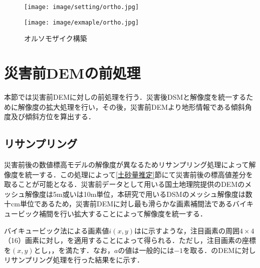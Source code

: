       \begin{figure}[t]
        \begin{minipage}[c]{0.45\hsize}
          \centering
          \texttt{[image: image/setting/ortho.jpg]}
          \label{オルソモザイク構築設定値}
        \end{minipage}
        \begin{minipage}[c]{0.45\hsize}
          \centering
          \texttt{[image: image/exmaple/ortho.jpg]}
          \label{オルソモザイク構築結果}
        \end{minipage}
        \caption{オルソモザイク構築}
      \end{figure}



  \section{災害前DEMの前処理}
    \label{災害前DEMの前処理}
    本節では災害前DEMに対しの前処理を行う．災害後DSMと解像度を統一するために解像度の拡大処理を行い，その後，災害前DEMより地形情報である傾斜角度及び傾斜方位を算出する．


    \subsection{リサンプリング}
      \label{リサンプリング}
      災害前後の数値標高モデルの解像度が異なるためリサンプリング処理によって解像度を統一する．この処理によって\ref{土砂量推定}節にて災害前後の標高値差分を取ることが可能となる．災害前データとして用いる国土地理院提供のDEMのメッシュ解像度は5m或いは10m単位，本研究で用いるDSMのメッシュ解像度は数十cm単位であるため，災害前DEMに対し最も滑らかな画素補間法であるバイキュービック補間\cite{バイキュービック法}を行い拡大することによって解像度を統一する．
      
      バイキュービック法による画素値$i(x,y)$はに示すような，注目画素の周囲$4\times4$（16）画素に対し，を適用することによって得られる．ただし，注目画素の座標を$(x,y)$とし，，を満たす．なお，$a$の値は一般的には$-1$を取る．のDEMに対しリサンプリング処理を行った結果をに示す．


